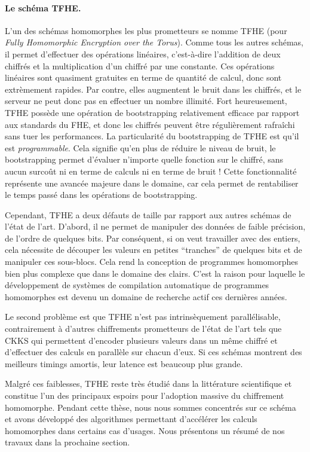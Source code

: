 \paragraph{Le schéma TFHE.}
L'un des schémas homomorphes les plus prometteurs se nomme TFHE \cite{JC:CGGI20} (pour \textit{Fully Homomorphic Encryption over the Torus}). Comme tous les autres schémas, il permet d'effectuer des opérations linéaires, c'est-à-dire l'addition de deux chiffrés et la multiplication d'un chiffré par une constante. Ces opérations linéaires sont quasiment gratuites en terme de quantité de calcul, donc sont extrèmement rapides. Par contre, elles augmentent le bruit dans les chiffrés, et le serveur ne peut donc pas en effectuer un nombre illimité. Fort heureusement, TFHE possède une opération de bootstrapping relativement efficace par rapport aux standards du FHE, et donc les chiffrés peuvent être régulièrement rafraîchi sans tuer les performances. 
La particularité du bootstrapping de TFHE est qu'il est \textit{programmable}. Cela signifie qu'en plus de réduire le niveau de bruit, le bootstrapping permet d'évaluer n'importe quelle fonction sur le chiffré, sans aucun surcoût ni en terme de calculs ni en terme de bruit ! Cette fonctionnalité représente une avancée majeure dans le domaine, car cela permet de rentabiliser le temps passé dans les opérations de bootstrapping.

Cependant, TFHE a deux défauts de taille par rapport aux autres schémas de l'état de l'art. D'abord, il ne permet de manipuler des données de faible précision, de l'ordre de quelques bits. Par conséquent, si on veut travailler avec des entiers, cela nécessite de découper les valeurs en petites ``tranches'' de quelques bits et de manipuler ces sous-blocs. Cela rend la conception de programmes homomorphes bien plus complexe que dans le domaine des clairs. C'est la raison pour laquelle le développement de systèmes de compilation automatique de programmes homomorphes est devenu un domaine de recherche actif ces dernières années.

Le second problème est que TFHE n'est pas intrinsèquement parallélisable, contrairement à d'autres chiffrements prometteurs de l'état de l'art tels que CKKS \cite{AC:CKKS17} qui permettent d'encoder plusieurs valeurs dans un même chiffré et d'effectuer des calculs en parallèle sur chacun d'eux. Si ces schémas montrent des meilleurs timings amortis, leur latence est beaucoup plus grande.


Malgré ces faiblesses, TFHE reste très étudié dans la littérature scientifique et constitue l'un des principaux espoirs pour l'adoption massive du chiffrement homomorphe. Pendant cette thèse, nous nous sommes concentrés sur ce schéma et avons développé des algorithmes permettant d'accélérer les calculs homomorphes dans certains cas d'usages. Nous présentons un résumé de nos travaux dans la prochaine section.




